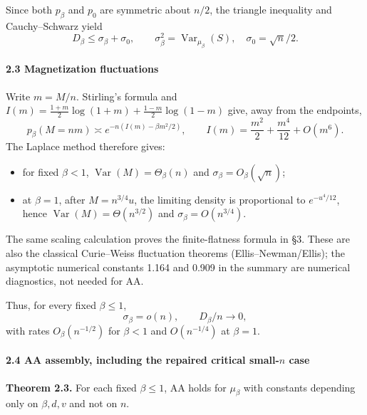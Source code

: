 Since both \(p_\beta\) and \(p_0\) are symmetric about \(n/2\), the triangle inequality and Cauchy--Schwarz yield
\[
D_\beta\le\sigma_\beta+\sigma_0,
\qquad \sigma_\beta^2=\operatorname{Var}_{\mu_\beta}(S),
\quad \sigma_0=\sqrt n/2. \tag{D-bound}
\]

\paragraph{2.3 Magnetization fluctuations}\label{magnetization-fluctuations}

Write \(m=M/n\). Stirling's formula and \(I(m)=\frac{1+m}{2}\log(1+m)+\frac{1-m}{2}\log(1-m)\) give, away from the endpoints,
\[p_\beta(M=nm)\asymp e^{-n(I(m)-\beta m^2/2)},\qquad
I(m)=\frac{m^2}{2}+\frac{m^4}{12}+O(m^6).\]
The Laplace method therefore gives:

\begin{itemize}
\tightlist
\item
  for fixed \(\beta<1\), \(\operatorname{Var}(M)=\Theta_\beta(n)\) and \(\sigma_\beta=O_\beta(\sqrt n)\);
\item
  at \(\beta=1\), after \(M=n^{3/4}u\), the limiting density is proportional to \(e^{-u^4/12}\), hence \(\operatorname{Var}(M)=\Theta(n^{3/2})\) and \(\sigma_\beta=O(n^{3/4})\).
\end{itemize}

The same scaling calculation proves the finite-flatness formula in §3. These are also the classical Curie--Weiss fluctuation theorems (Ellis--Newman/Ellis); the asymptotic numerical constants 1.164 and 0.909 in the summary are numerical diagnostics, not needed for AA.

Thus, for every fixed \(\beta\le1\),
\[\sigma_\beta=o(n),\qquad D_\beta/n\to0,\]
with rates \(O_{\beta}(n^{-1/2})\) for \(\beta<1\) and \(O(n^{-1/4})\) at \(\beta=1\).

\paragraph{\texorpdfstring{2.4 AA assembly, including the repaired critical small-\(n\) case}{2.4 AA assembly, including the repaired critical small-n case}}\label{aa-assembly-including-the-repaired-critical-small-n-case}

\textbf{Theorem 2.3.} For each fixed \(\beta\le1\), AA holds for \(\mu_\beta\) with constants depending only on \(\beta,d,v\) and not on \(n\).

